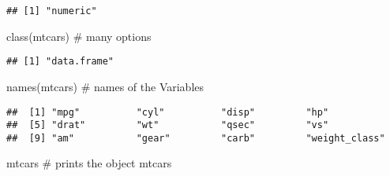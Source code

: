 \documentclass[]{article}
\newenvironment{Shaded}{\begin{snugshade}}{\end{snugshade}}
\newcommand{\KeywordTok}[1]{\textcolor[rgb]{0.94,0.87,0.69}{{#1}}}
\newcommand{\CommentTok}[1]{\textcolor[rgb]{0.50,0.62,0.50}{{#1}}}
\newcommand{\NormalTok}[1]{\textcolor[rgb]{0.80,0.80,0.80}{{#1}}}
\begin{document}
\begin{Shaded}
\end{Shaded}

\begin{verbatim}
## [1] "numeric"
\end{verbatim}

\begin{Shaded}
\begin{Highlighting}[]
\KeywordTok{class}\NormalTok{(mtcars) }\CommentTok{# many options}
\end{Highlighting}
\end{Shaded}

\begin{verbatim}
## [1] "data.frame"
\end{verbatim}

\begin{Shaded}
\begin{Highlighting}[]
\KeywordTok{names}\NormalTok{(mtcars) }\CommentTok{# names of the Variables}
\end{Highlighting}
\end{Shaded}

\begin{verbatim}
##  [1] "mpg"          "cyl"          "disp"         "hp"          
##  [5] "drat"         "wt"           "qsec"         "vs"          
##  [9] "am"           "gear"         "carb"         "weight_class"
\end{verbatim}

\begin{Shaded}
\begin{Highlighting}[]
\NormalTok{mtcars     }\CommentTok{# prints the object mtcars}
\end{Highlighting}
\end{Shaded}
\end{document}
